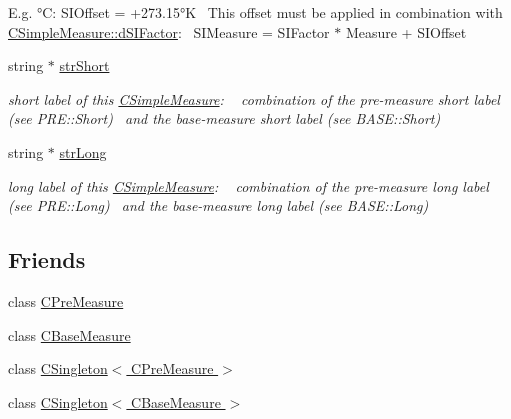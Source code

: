 \begin{DoxyCompactItemize}
\begin{DoxyCompactList}
 E.\+g. °C\+: S\+I\+Offset = +273.15°K~\newline
 This offset must be applied in combination with \hyperlink{classCSimpleMeasure_a08be520f9d3a0e50cc63693f2fc607f2}{C\+Simple\+Measure\+::d\+S\+I\+Factor}\+:~\newline
 S\+I\+Measure = S\+I\+Factor $\ast$ Measure + S\+I\+Offset \end{DoxyCompactList}\item 
string $\ast$ \hyperlink{classCSimpleMeasure_a39260e6516c163955c34dce6795292ad}{str\+Short}
\begin{DoxyCompactList}\small\item\em short label of this \hyperlink{classCSimpleMeasure}{C\+Simple\+Measure}\+: ~\newline
 combination of the pre-\/measure short label (see P\+R\+E\+::\+Short)~\newline
 and the base-\/measure short label (see B\+A\+S\+E\+::\+Short) \end{DoxyCompactList}\item 
string $\ast$ \hyperlink{classCSimpleMeasure_a5761fb46fb35ce577066ef1e7ec1ab2e}{str\+Long}
\begin{DoxyCompactList}\small\item\em long label of this \hyperlink{classCSimpleMeasure}{C\+Simple\+Measure}\+: ~\newline
 combination of the pre-\/measure long label (see P\+R\+E\+::\+Long)~\newline
 and the base-\/measure long label (see B\+A\+S\+E\+::\+Long) \end{DoxyCompactList}\end{DoxyCompactItemize}
\subsection*{Friends}
\begin{DoxyCompactItemize}
\item 
class \hyperlink{classCSimpleMeasure_a39437e1df05e59fd328fbf69e55b45fa}{C\+Pre\+Measure}
\item 
class \hyperlink{classCSimpleMeasure_a49ff8edb85c7d35ec3940a509b2c748f}{C\+Base\+Measure}
\item 
class \hyperlink{classCSimpleMeasure_acbeb06f43abf4b8c9a86136c2b7bfe5f}{C\+Singleton$<$ C\+Pre\+Measure $>$}
\item 
class \hyperlink{classCSimpleMeasure_ac514d5155adc5a8f0ed981fdb4815491}{C\+Singleton$<$ C\+Base\+Measure $>$}
\end{DoxyCompactItemize}


